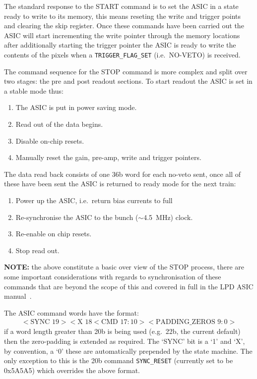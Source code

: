 The standard response to the START command is to set the ASIC in a state ready to write to its memory, this means reseting the write and trigger points and clearing the skip register. Once these commands have been carried out the ASIC will start incrementing the write pointer through the memory locations after additionally starting the trigger pointer the ASIC is ready to write the contents of the pixels when a \texttt{TRIGGER\_FLAG\_SET} (i.e.\ NO-VETO) is received. 

The command sequence for the STOP command is more complex and split over two stages: the pre and post readout sections. To start readout the ASIC is set in a stable mode thus:
\begin{enumerate}
  \item The ASIC is put in power saving mode.
  \item Read out of the data begins.
  \item Disable on-chip resets.
  \item Manually reset the gain, pre-amp, write and trigger pointers.
\end{enumerate}
The data read back consists of one 36b word for each no-veto sent, once all of these have been sent the ASIC is returned to ready mode for the next train:
\begin{enumerate}
  \item Power up the ASIC, i.e.\ return bias currents to full
  \item Re-synchronise the ASIC to the bunch (\( \sim \)4.5~MHz) clock.
  \item Re-enable on chip resets.
  \item Stop read out.
\end{enumerate}
\textbf{NOTE:} the above constitute a basic over view of the STOP process, there are some important considerations with regards to synchronisation of these commands that are beyond the scope of this and covered in full in the LPD ASIC manual~\cite{lpd_manual}.

The ASIC command words have the format:
\begin{align}\label{fmt:asic_format}
  <\text{SYNC }19><\text{X }18<\text{CMD } 17:10><\text{PADDING\_ZEROS } 9:0>
\end{align}
if a word length greater than 20b is being used (e.g.\ 22b, the current default) then the zero-padding is extended as required. The `SYNC' bit is a `1' and `X', by convention, a `0' these are automatically prepended by the state machine. The only exception to this is the 20b command \texttt{SYNC\_RESET} (currently set to be 0x5A5A5) which overrides the above format.

